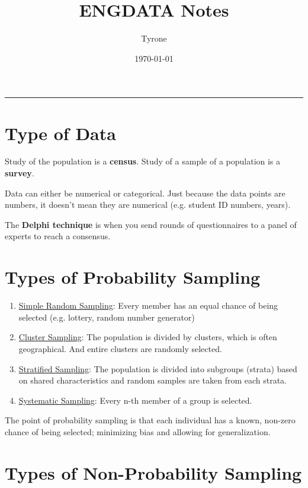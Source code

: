 \documentclass[11pt]{article}
\author{Tyrone}
\date{\today}
\title{ENGDATA Notes}
\begin{document}
\maketitle
\tableofcontents


\noindent\rule{\textwidth}{0.5pt}
\section{Type of Data}
\label{sec:org1e67d3c}

Study of the population is a \textbf{census}. Study of a sample of a population is a \textbf{survey}.

Data can either be numerical or categorical. Just because the data points are numbers, it doesn't mean they are numerical (e.g. student ID numbers, years).

The \textbf{Delphi technique} is when you send rounds of questionnaires to a panel of experts to reach a consensus.
\section{Types of Probability Sampling}
\label{sec:orga6cff89}

\begin{enumerate}
\item \uline{Simple Random Sampling}: Every member has an equal chance of being selected (e.g. lottery, random number generator)

\item \uline{Cluster Sampling}: The population is divided by clusters, which is often geographical. And entire clusters are randomly selected.

\item \uline{Stratified Sampling}: The population is divided into subgroups (strata) based on shared characteristics and random samples are taken from each strata.

\item \uline{Systematic Sampling}: Every n-th member of a group is selected.
\end{enumerate}


The point of probability sampling is that each individual has a known, non-zero chance of being selected; minimizing bias and allowing for generalization.
\section{Types of Non-Probability Sampling}
\label{sec:org915d821}
\end{document}
